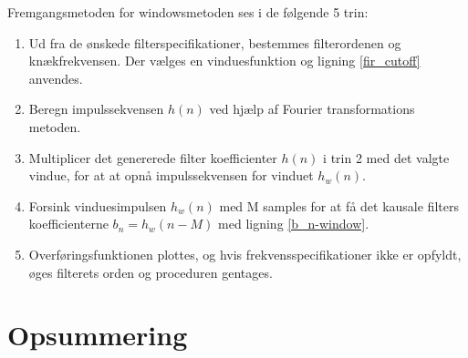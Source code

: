 Fremgangsmetoden for windowsmetoden ses i de følgende 5 trin:
\begin{enumerate}
	\item Ud fra de ønskede filterspecifikationer, bestemmes filterordenen og knækfrekvensen. Der vælges en vinduesfunktion og ligning \ref{fir_cutoff} anvendes.
	\item Beregn impulssekvensen $h(n)$ ved hjælp af Fourier transformations metoden.
	\item Multiplicer det genererede filter koefficienter $h(n)$ i trin 2 med det valgte vindue, for at at opnå impulssekvensen for vinduet $h_w(n)$.
	\item Forsink vinduesimpulsen $h_w(n)$ med M samples for at få det kausale filters koefficienterne $b_n = h_w(n-M)$ med ligning \ref{b_n-window}.
	\item Overføringsfunktionen plottes, og hvis frekvensspecifikationer ikke er opfyldt, øges filterets orden og proceduren gentages.
\end{enumerate}


\section{Opsummering}

